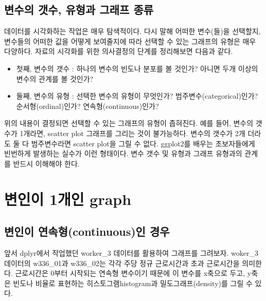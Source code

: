 \documentclass[
]{book}
\theoremstyle{definition}
\theoremstyle{definition}
\theoremstyle{definition}
\theoremstyle{definition}
\theoremstyle{remark}
\begin{document}
\hypertarget{uxbcc0uxc218uxc758-uxac2fuxc218-uxc720uxd615uxacfc-uxadf8uxb798uxd504-uxc885uxb958}{%
\subsection{변수의 갯수, 유형과 그래프 종류}\label{uxbcc0uxc218uxc758-uxac2fuxc218-uxc720uxd615uxacfc-uxadf8uxb798uxd504-uxc885uxb958}}

데이터를 시각화하는 작업은 매우 탐색적이다. 다시 말해 어떠한 변수(들)을 선택할지, 변수들의 어떠한 값을 어떻게 보여줄지에 따라 선택할 수 있는 그래프의 유형은 매우 다양하다.
자료의 시각화를 위한 의사결정의 단계를 정리해보면 다음과 같다.

\begin{itemize}
\item
  첫째, 변수의 갯수 : 하나의 변수의 빈도나 분포를 볼 것인가? 아니면 두개 이상의 변수의 관계를 볼 것인가?
\item
  둘째, 변수의 유형 : 선택한 변수의 유형이 무엇인가? 범주변수(categorical)인가? 순서형(ordinal)인가? 연속형(continuous)인가?
\end{itemize}

위의 내용이 결정되면 선택할 수 있는 그래프의 유형이 좁혀진다. 예를 들어, 변수의 갯수가 1개라면, scatter plot 그래프를 그리는 것이 불가능하다. 변수의 갯수가 2개 더라도 둘 다 범주변수라면 scatter plot을 그릴 수 없다. ggplot2를 배우는 초보자들에게 빈번하게 발생하는 실수가 이런 형태이다. 변수 갯수 및 유형과 그래프 유형과의 관계를 반드시 이해해야 한다.

\hypertarget{uxbcc0uxc778uxc774-1uxac1cuxc778-graph}{%
\section{변인이 1개인 graph}\label{uxbcc0uxc778uxc774-1uxac1cuxc778-graph}}

\hypertarget{uxbcc0uxc778uxc774-uxc5f0uxc18duxd615continuousuxc778-uxacbduxc6b0}{%
\subsection{변인이 연속형(continuous)인 경우}\label{uxbcc0uxc778uxc774-uxc5f0uxc18duxd615continuousuxc778-uxacbduxc6b0}}

앞서 dplyr에서 작업했던 worker\_3 데이터를 활용하여 그래프를 그려보자. woker\_3 데이터의 w336\_01과 w336\_02는 각각 주당 정규 근로시간과 초과 근로시간을 의미한다. 근로시간은 0부터 시작되는 연속형 변수이기 때문에 이 변수를 x축으로 두고, y축은 빈도나 비율로 표현하는 히스토그램histogram과 밀도그래프(density)를 그릴 수 있다.
\end{document}
